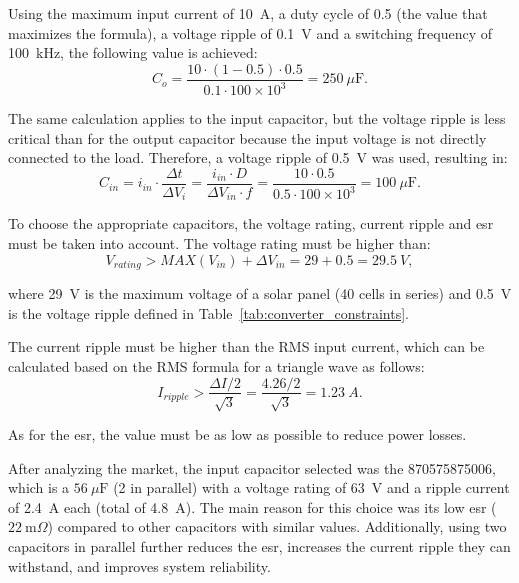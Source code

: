     Using the maximum input current of 10~A, a duty cycle of 0.5 (the value that maximizes the formula), a voltage ripple of 0.1~V and a switching frequency of 100~kHz, the following value is achieved:
    \begin{equation}
        C_o = \frac{10 \cdot (1-0.5) \cdot 0.5}{0.1 \cdot 100 \times 10^{3}} = 250~\mu\mathrm{F}.
    \end{equation}

    The same calculation applies to the input capacitor, but the voltage ripple is less critical than for the output capacitor because the input voltage is not directly connected to the load. Therefore, a voltage ripple of 0.5~V was used, resulting in:
    \begin{equation}
        C_{in} = i_{in} \cdot \frac{\Delta t}{\Delta V_i} = \frac{i_{in} \cdot D}{\Delta V_{in} \cdot f}  =  \frac{10 \cdot 0.5}{0.5 \cdot 100 \times 10^{3}} = 100~\mu\mathrm{F}.
    \end{equation}

    To choose the appropriate capacitors, the voltage rating, current ripple and \ac{esr} must be taken into account. The voltage rating must be higher than:
    \begin{equation}
        V_{rating} > MAX(V_{in}) + \Delta V_{in} = 29 + 0.5 = 29.5~V,
    \end{equation}

    \noindent where 29~V is the maximum voltage of a solar panel (40 cells in series) and 0.5~V is the voltage ripple defined in Table~\ref{tab:converter_constraints}.

    The current ripple must be higher than the RMS input current, which can be calculated based on the RMS formula for a triangle wave as follows:
    \begin{equation}
        I_{ripple} > \frac{\Delta I / 2}{\sqrt{3}} = \frac{4.26 / 2}{\sqrt{3}} = 1.23~A.
    \end{equation}

    As for the \ac{esr}, the value must be as low as possible to reduce power losses. 

    After analyzing the market, the input capacitor selected was the 870575875006, which is a $56~\mu\mathrm{F}$ (2 in parallel) with a voltage rating of 63~V and a ripple current of 2.4~A each (total of 4.8~A). The main reason for this choice was its low \ac{esr} ($22~\mathrm{m}\Omega$) compared to other capacitors with similar values. Additionally, using two capacitors in parallel further reduces the \ac{esr}, increases the current ripple they can withstand, and improves system reliability.

